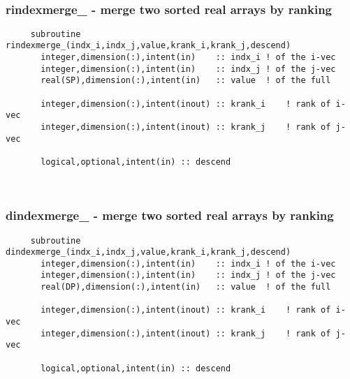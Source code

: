 \mbox{}\hrulefill\ 

  \subsubsection{rindexmerge\_ - merge two sorted real arrays by ranking}

\begin{verbatim} 
     subroutine rindexmerge_(indx_i,indx_j,value,krank_i,krank_j,descend)
       integer,dimension(:),intent(in)    :: indx_i	! of the i-vec
       integer,dimension(:),intent(in)    :: indx_j	! of the j-vec
       real(SP),dimension(:),intent(in)   :: value	! of the full
 
       integer,dimension(:),intent(inout) :: krank_i	! rank of i-vec
       integer,dimension(:),intent(inout) :: krank_j	! rank of j-vec
 
       logical,optional,intent(in) :: descend
 \end{verbatim}%
 
 
\mbox{}\hrulefill\ 
 
  \subsubsection{dindexmerge\_ - merge two sorted real arrays by ranking}

\begin{verbatim} 
     subroutine dindexmerge_(indx_i,indx_j,value,krank_i,krank_j,descend)
       integer,dimension(:),intent(in)    :: indx_i	! of the i-vec
       integer,dimension(:),intent(in)    :: indx_j	! of the j-vec
       real(DP),dimension(:),intent(in)   :: value	! of the full
 
       integer,dimension(:),intent(inout) :: krank_i	! rank of i-vec
       integer,dimension(:),intent(inout) :: krank_j	! rank of j-vec
 
       logical,optional,intent(in) :: descend
 \end{verbatim}%
 
